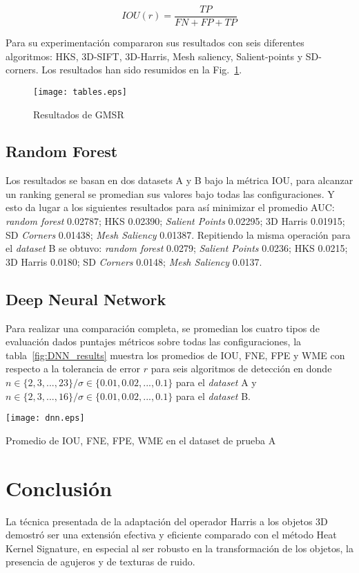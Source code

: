 \documentclass[conference]{IEEEtran}
\begin{document}
\begin{equation} \label{eq:IOU}
IOU(r) = \frac{TP}{FN + FP + TP}
\end{equation}

Para su experimentación compararon sus resultados con seis diferentes algoritmos: HKS, 3D-SIFT, 3D-Harris, Mesh saliency, Salient-points y SD-corners. Los resultados han sido resumidos en la Fig.~\ref{fig:GMSR_results}.

\begin{figure}
\texttt{[image: tables.eps]}
\caption{Resultados de GMSR \cite{gmsr}}
\label{fig:GMSR_results}
\end{figure}

\subsection{Random Forest}
Los resultados se basan en dos datasets A y B bajo la métrica IOU, para alcanzar un ranking general se promedian sus valores bajo todas las configuraciones. Y esto da lugar a los siguientes resultados para así minimizar el promedio AUC: \textit{random forest} 0.02787; HKS 0.02390; \textit{Salient Points} 0.02295; 3D Harris 0.01915; SD \textit{Corners} 0.01438; \textit{Mesh Saliency} 0.01387. Repitiendo la misma operación para el \textit{dataset} B se obtuvo: \textit{random forest} 0.0279; \textit{Salient Points} 0.0236; HKS 0.0215; 3D Harris 0.0180; SD \textit{Corners} 0.0148; \textit{Mesh Saliency} 0.0137.

\subsection{Deep Neural Network}
Para realizar una comparación completa, se promedian los cuatro tipos de evaluación dados puntajes métricos sobre todas las configuraciones, la tabla~\ref{fig:DNN_results} muestra los promedios de IOU, FNE, FPE y WME con respecto a la tolerancia de error $r$ para seis algoritmos de detección en donde $n \in \{2, 3, ..., 23\} / \sigma \in \{0.01, 0.02, ..., 0.1\}$ para el \textit{dataset} A y $n \in \{2, 3, ..., 16\} / \sigma \in \{0.01, 0.02, ..., 0.1\}$ para el \textit{dataset} B.
\begin{table}
\texttt{[image: dnn.eps]}
\caption{Promedio de IOU, FNE, FPE, WME en el dataset de prueba A \cite{dnn}}
\label{fig:DNN_results}
\end{table}

\section{Conclusión}
La técnica presentada de la adaptación del operador Harris a los objetos 3D demostró ser una extensión efectiva y eficiente comparado con el método Heat Kernel Signature, en especial al ser robusto en la transformación de los objetos, la presencia de agujeros y de texturas de ruido.
\end{document}

